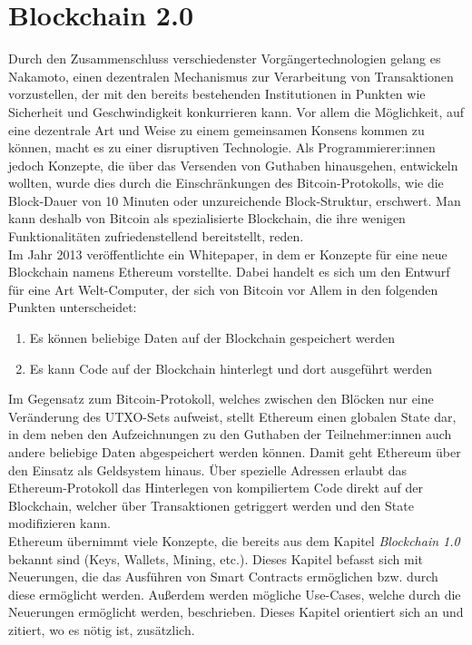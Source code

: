 \chapter{Blockchain 2.0}
Durch den Zusammenschluss verschiedenster Vorgängertechnologien gelang es Nakamoto, einen dezentralen Mechanismus zur Verarbeitung von Transaktionen vorzustellen, der mit den bereits bestehenden Institutionen in Punkten wie Sicherheit und Geschwindigkeit konkurrieren kann. Vor allem die Möglichkeit, auf eine dezentrale Art und Weise zu einem gemeinsamen Konsens kommen zu können, macht es zu einer disruptiven Technologie. Als Programmierer:innen jedoch Konzepte, die über das Versenden von Guthaben hinausgehen, entwickeln wollten, wurde dies durch die Einschränkungen des Bitcoin-Protokolls, wie die Block-Dauer von 10 Minuten oder unzureichende Block-Struktur, erschwert. Man kann deshalb von Bitcoin als spezialisierte Blockchain, die ihre wenigen Funktionalitäten zufriedenstellend bereitstellt, reden.\\

Im Jahr 2013 veröffentlichte \cite{buterin_whitepaper_2013} ein Whitepaper, in dem er Konzepte für eine neue Blockchain namens Ethereum vorstellte. Dabei handelt es sich um den Entwurf für eine Art Welt-Computer, der sich von Bitcoin vor Allem in den folgenden Punkten unterscheidet:
\begin{enumerate}
	\item Es können beliebige Daten auf der Blockchain gespeichert werden
	\item Es kann Code auf der Blockchain hinterlegt und dort ausgeführt werden
	\end{enumerate}
Im Gegensatz zum Bitcoin-Protokoll, welches zwischen den Blöcken nur eine Veränderung des UTXO-Sets aufweist, stellt Ethereum einen globalen State dar, in dem neben den Aufzeichnungen zu den Guthaben der Teilnehmer:innen auch andere beliebige Daten abgespeichert werden können. Damit geht Ethereum über den Einsatz als Geldsystem hinaus.
Über spezielle Adressen erlaubt das Ethereum-Protokoll das Hinterlegen von kompiliertem Code direkt auf der Blockchain, welcher über Transaktionen getriggert werden und den State modifizieren kann. 
\\

Ethereum übernimmt viele Konzepte, die bereits aus dem Kapitel \emph{Blockchain 1.0} bekannt sind (Keys, Wallets, Mining, etc.). Dieses Kapitel befasst sich mit Neuerungen, die das Ausführen von Smart Contracts ermöglichen bzw. durch diese ermöglicht werden. Außerdem werden mögliche Use-Cases, welche durch die Neuerungen ermöglicht werden, beschrieben. Dieses Kapitel orientiert sich an \cite{antanopoulos_2018} und zitiert, wo es nötig ist, zusätzlich.
